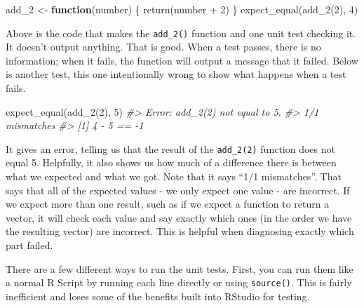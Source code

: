 \documentclass[
]{krantz}
\makeatletter
\newenvironment{Shaded}{\begin{snugshade}}{\end{snugshade}}
\newcommand{\CommentTok}[1]{\textcolor[rgb]{0.37,0.37,0.37}{\textit{#1}}}
\newcommand{\ControlFlowTok}[1]{\textcolor[rgb]{0.27,0.27,0.27}{\textbf{#1}}}
\newcommand{\DecValTok}[1]{\textcolor[rgb]{0.06,0.06,0.06}{#1}}
\newcommand{\FunctionTok}[1]{\textcolor[rgb]{0,0,0}{#1}}
\newcommand{\NormalTok}[1]{#1}
\newcommand{\OtherTok}[1]{\textcolor[rgb]{0.37,0.37,0.37}{#1}}
\newcommand{\SpecialCharTok}[1]{\textcolor[rgb]{0,0,0}{#1}}
\newenvironment{kframe}{%
\medskip{}
\setlength{\fboxsep}{.8em}
 \def\at@end@of@kframe{}%
 \ifinner\ifhmode%
  \def\at@end@of@kframe{\end{minipage}}%
  \begin{minipage}{\columnwidth}%
 \fi\fi%
 \def\FrameCommand##1{\hskip\@totalleftmargin \hskip-\fboxsep
 \colorbox{shadecolor}{##1}\hskip-\fboxsep
     \hskip-\linewidth \hskip-\@totalleftmargin \hskip\columnwidth}%
 \MakeFramed {\advance\hsize-\width
   \@totalleftmargin\z@ \linewidth\hsize
   \@setminipage}}%
 {\par\unskip\endMakeFramed%
 \at@end@of@kframe}
\renewenvironment{Shaded}{\begin{kframe}}{\end{kframe}}
\makeatother
\begin{document}
\begin{Shaded}
\begin{Highlighting}[]
\NormalTok{add\_2 }\OtherTok{\textless{}{-}} \ControlFlowTok{function}\NormalTok{(number) \{ }\FunctionTok{return}\NormalTok{(number }\SpecialCharTok{+} \DecValTok{2}\NormalTok{) \}}
\FunctionTok{expect\_equal}\NormalTok{(}\FunctionTok{add\_2}\NormalTok{(}\DecValTok{2}\NormalTok{), }\DecValTok{4}\NormalTok{)}
\end{Highlighting}
\end{Shaded}

Above is the code that makes the \texttt{add\_2()} function and one unit test checking it. It doesn't output anything. That is good. When a test passes, there is no information; when it fails, the function will output a message that it failed. Below is another test, this one intentionally wrong to show what happens when a test fails.

\begin{Shaded}
\begin{Highlighting}[]
\FunctionTok{expect\_equal}\NormalTok{(}\FunctionTok{add\_2}\NormalTok{(}\DecValTok{2}\NormalTok{), }\DecValTok{5}\NormalTok{)}
\CommentTok{\#\textgreater{} Error: add\_2(2) not equal to 5.}
\CommentTok{\#\textgreater{} 1/1 mismatches}
\CommentTok{\#\textgreater{} [1] 4 {-} 5 == {-}1}
\end{Highlighting}
\end{Shaded}

It gives an error, telling us that the result of the \texttt{add\_2(2)} function does not equal 5. Helpfully, it also shows us how much of a difference there is between what we expected and what we got. Note that it says ``1/1 mismatches''. That says that all of the expected values - we only expect one value - are incorrect. If we expect more than one result, such as if we expect a function to return a vector, it will check each value and say exactly which ones (in the order we have the resulting vector) are incorrect. This is helpful when diagnosing exactly which part failed.

There are a few different ways to run the unit tests. First, you can run them like a normal R Script by running each line directly or using \texttt{source()}. This is fairly inefficient and loses some of the benefits built into RStudio for testing.
\end{document}

